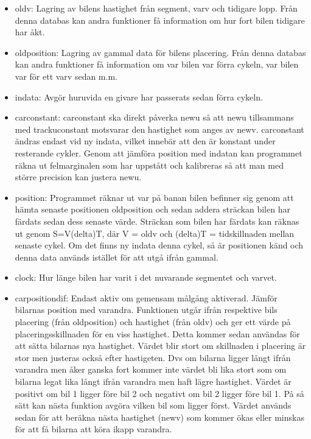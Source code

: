     \begin{itemize}
	\item old\textunderscore v: Lagring av bilens hastighet från segment, varv och tidigare lopp. Från denna databas kan andra funktioner få information om hur fort bilen tidigare har åkt. 	\item old\textunderscore position: Lagring av gammal data för bilens placering. Från denna databas kan andra funktioner få information om var bilen var förra cykeln, var bilen var för ett varv sedan m.m.
      \item indata: Avgör huruvida en givare har passerats sedan förra cykeln.

      \item car\textunderscore constant: car\textunderscore constant ska direkt påverka new\textunderscore u så att new\textunderscore u tillsammans med track\textunderscore u\textunderscore constant motsvarar den hastighet som anges av new\textunderscore v. car\textunderscore constant ändras endast vid ny indata, vilket innebär att den är konstant under resterande cykler. Genom att jämföra position med indatan kan programmet räkna ut felmarginalen som har uppstått och kalibreras så att man med större precision kan justera new\textunderscore u.
 
      \item position: Programmet räknar ut var på banan bilen befinner sig genom att hämta senaste positionen old\textunderscore position och sedan addera sträckan bilen har färdats sedan dess senaste värde. Sträckan som bilen har färdats kan räknas ut genom S=V\textasteriskcentered (delta)T, där V = old\textunderscore v och (delta)T = tidskillnaden mellan senaste cykel. Om det finns ny indata denna cykel, så är positionen känd och denna data används istället för att utgå ifrån gammal.
      \item clock: Hur länge bilen har varit i det nuvarande segmentet och varvet.

      \item car\textunderscore position\textunderscore dif: Endast aktiv om gemensam målgång aktiverad. Jämför bilarnas position med varandra. Funktionen utgår ifrån respektive bils placering (från old\textunderscore position) och hastighet (från old\textunderscore v) 
och ger ett värde på placeringsskillnaden för en viss hastighet. Detta kommer
sedan användas för att sätta bilarnas nya hastighet. Värdet blir stort om skillnaden i placering är stor men justeras också efter hastigeten. Dvs om bilarna ligger långt ifrån varandra men åker ganska fort kommer inte värdet bli lika stort som om bilarna legat lika långt ifrån varandra men haft lägre hastighet. Värdet är positivt om bil 1 ligger före bil 2 och negativt om bil 2 ligger före bil 1. På så sätt kan nästa funktion avgöra vilken bil som ligger först.
Värdet används sedan för att beräkna nästa hastighet (new\textunderscore v) som kommer ökas eller minskas för att få bilarna att köra ikapp varandra. 


\end{itemize}
